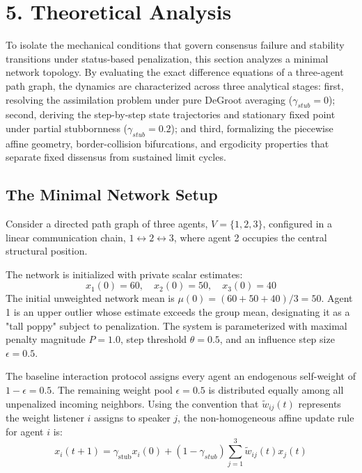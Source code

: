 \section{5. Theoretical Analysis}
To isolate the mechanical conditions that govern consensus failure and stability transitions under status-based penalization, this section analyzes a minimal network topology\cite{degroot1974reaching}. By evaluating the exact difference equations of a three-agent path graph, the dynamics are characterized across three analytical stages\cite{degroot1974reaching}: first, resolving the assimilation problem under pure DeGroot averaging ($\gamma_{stub} = 0$)\cite{degroot1974reaching}; second, deriving the step-by-step state trajectories and stationary fixed point under partial stubbornness ($\gamma_{stub} = 0.2$)\cite{degroot1974reaching}; and third, formalizing the piecewise affine geometry, border-collision bifurcations, and ergodicity properties that separate fixed dissensus from sustained limit cycles\cite{acemoglu2013opinion,hajnal1958weak}.

\subsection{The Minimal Network Setup}
Consider a directed path graph of three agents, $V = \{1, 2, 3\}$, configured in a linear communication chain, $1 \leftrightarrow 2 \leftrightarrow 3$, where agent 2 occupies the central structural position\cite{degroot1974reaching}.

The network is initialized with private scalar estimates\cite{degroot1974reaching}: $$x_1(0) = 60, \quad x_2(0) = 50, \quad x_3(0) = 40$$ The initial unweighted network mean is $\mu(0) = (60 + 50 + 40)/3 = 50$\cite{degroot1974reaching}. Agent 1 is an upper outlier whose estimate exceeds the group mean, designating it as a "tall poppy" subject to penalization\cite{degroot1974reaching}. The system is parameterized with maximal penalty magnitude $P = 1.0$, step threshold $\theta = 0.5$, and an influence step size $\epsilon = 0.5$\cite{degroot1974reaching}.

The baseline interaction protocol assigns every agent an endogenous self-weight of $1 - \epsilon = 0.5$\cite{degroot1974reaching}. The remaining weight pool $\epsilon = 0.5$ is distributed equally among all unpenalized incoming neighbors\cite{degroot1974reaching}. Using the convention that $\tilde{w}_{ij}(t)$ represents the weight listener $i$ assigns to speaker $j$, the non-homogeneous affine update rule for agent $i$ is\cite{degroot1974reaching}: $$x_i(t+1) = \gamma_{\text{stub}} x_i(0) + (1 - \gamma_{stub}) \sum_{j=1}^3 \tilde{w}_{ij}(t) x_j(t)$$

